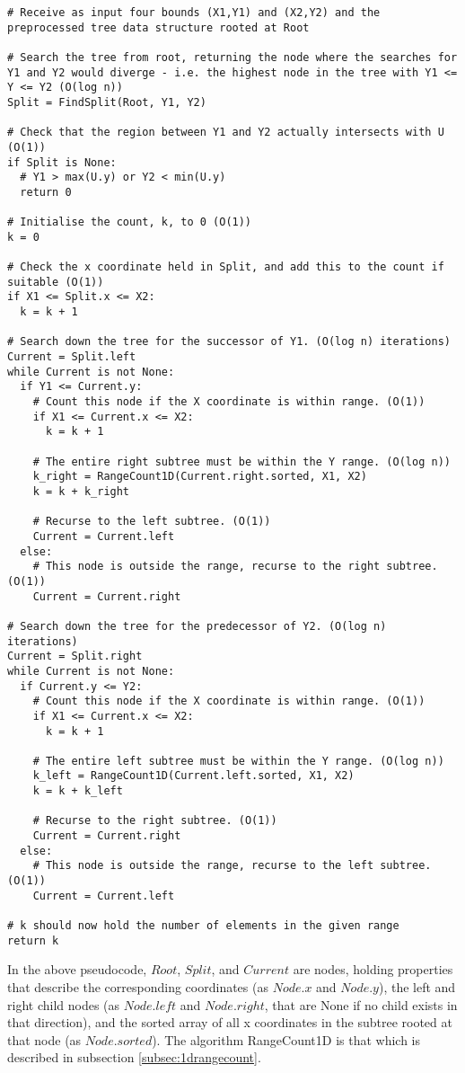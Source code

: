 \documentclass[paper=a4, fontsize=12pt]{article}
\begin{document}
\begin{lstlisting}
# Receive as input four bounds (X1,Y1) and (X2,Y2) and the preprocessed tree data structure rooted at Root

# Search the tree from root, returning the node where the searches for Y1 and Y2 would diverge - i.e. the highest node in the tree with Y1 <= Y <= Y2 (O(log n))
Split = FindSplit(Root, Y1, Y2)

# Check that the region between Y1 and Y2 actually intersects with U (O(1))
if Split is None:
  # Y1 > max(U.y) or Y2 < min(U.y)
  return 0

# Initialise the count, k, to 0 (O(1))
k = 0

# Check the x coordinate held in Split, and add this to the count if suitable (O(1))
if X1 <= Split.x <= X2:
  k = k + 1

# Search down the tree for the successor of Y1. (O(log n) iterations)
Current = Split.left
while Current is not None:
  if Y1 <= Current.y:
    # Count this node if the X coordinate is within range. (O(1))
    if X1 <= Current.x <= X2:
      k = k + 1

    # The entire right subtree must be within the Y range. (O(log n))
    k_right = RangeCount1D(Current.right.sorted, X1, X2)
    k = k + k_right

    # Recurse to the left subtree. (O(1))
    Current = Current.left
  else:
    # This node is outside the range, recurse to the right subtree. (O(1))
    Current = Current.right

# Search down the tree for the predecessor of Y2. (O(log n) iterations)
Current = Split.right
while Current is not None:
  if Current.y <= Y2:
    # Count this node if the X coordinate is within range. (O(1))
    if X1 <= Current.x <= X2:
      k = k + 1

    # The entire left subtree must be within the Y range. (O(log n))
    k_left = RangeCount1D(Current.left.sorted, X1, X2)
    k = k + k_left

    # Recurse to the right subtree. (O(1))
    Current = Current.right
  else:
    # This node is outside the range, recurse to the left subtree. (O(1))
    Current = Current.left

# k should now hold the number of elements in the given range
return k
\end{lstlisting}

In the above pseudocode, \(Root\), \(Split\), and \(Current\) are nodes,
holding properties that describe the corresponding coordinates (as \(Node.x\)
and \(Node.y\)), the left and right child nodes (as \(Node.left\) and
\(Node.right\), that are None if no child exists in that direction), and the
sorted array of all x coordinates in the subtree rooted at that node (as
\(Node.sorted\)). The algorithm RangeCount1D is that which is described in
subsection \ref{subsec:1drangecount}.
\end{document}
